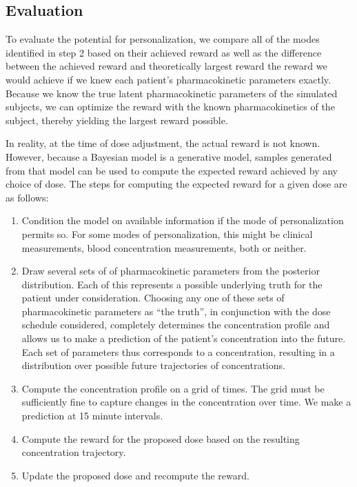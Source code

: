 \subsection{Evaluation}

To evaluate the potential for personalization, we compare all of the modes identified in step 2 based on their achieved reward as well as the difference between the achieved reward and theoretically largest reward the reward we would achieve if we knew each patient's pharmacokinetic parameters exactly. Because we know the true latent pharmacokinetic parameters of the simulated subjects, we can optimize the reward with the known pharmacokinetics of the subject, thereby yielding the largest reward possible.

In reality, at the time of dose adjustment, the actual reward is not known.  However, because a Bayesian model is a generative model, samples generated from that model can be used to compute the expected reward achieved by any choice of dose.  The steps for computing the expected reward for a given dose are as follows:

\begin{enumerate}
	\item Condition the model on available information if the mode of personalization permits so.  For some modes of personalization, this might be clinical measurements, blood concentration measurements, both or neither.
	
	\item Draw several sets of of pharmacokinetic parameters from the posterior distribution. Each of this represents a possible underlying truth for the patient  under consideration. Choosing any one of these sets of pharmacokinetic parameters as ``the truth'', in conjunction with the dose schedule considered, completely determines the concentration profile and allows us to make a prediction of the patient's concentration into the future. Each set of parameters thus corresponds to a concentration, resulting in a distribution over possible future trajectories of concentrations.
	
	\item Compute the concentration profile on a grid of times.  The grid must be sufficiently fine to capture changes in the concentration over time.  We make a prediction at 15 minute intervals.
	
	\item Compute the reward for the proposed dose based on the resulting concentration trajectory.
	
	\item Update the proposed dose and recompute the reward.
\end{enumerate}

